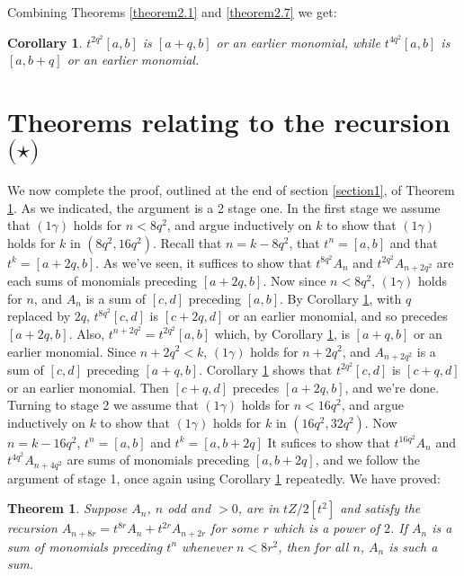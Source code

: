 \documentclass{monsky2009}
\newtheorem{theorem}[definition]{Theorem}
\newtheorem{corollary}[definition]{Corollary}
\begin{document}
Combining Theorems \ref{theorem2.1} and \ref{theorem2.7} we get:

\begin{corollary}%
\label{corollary2.8}
$t^{2q^{2}}[a,b]$ is $[a+q,b]$ or an earlier monomial, while $t^{4q^{2}}[a,b]$ is $[a,b+q]$ or an earlier monomial.
\end{corollary}

\section{Theorems relating to the recursion $\bm (\star)$}
\label{section3}

We now complete the proof, outlined at the end of section \ref{section1}, of Theorem \ref{theorem3.1}. As we indicated, the argument is a 2 stage one. In the first stage we assume that $(1\gamma)$ holds for $n<8q^{2}$, and argue inductively on $k$ to show that $(1\gamma)$ holds for $k$ in $(8q^{2}, 16q^{2})$. Recall that $n=k-8q^{2}$, that $t^{n}=[a,b]$ and that $t^{k}=[a+2q, b]$. As we've seen, it suffices to show that $t^{8q^{2}}A_{n}$ and $t^{2q^{2}}A_{n+2q^{2}}$ are each sums of monomials preceding $[a+2q,b]$. Now since $n<8q^{2}$, $(1\gamma)$ holds for $n$, and $A_{n}$ is a sum of $[c,d]$ preceding $[a,b]$. By Corollary \ref{corollary2.8}, with $q$ replaced by $2q$, $t^{8q^{2}}[c,d]$ is $[c+2q,d]$ or an earlier monomial, and so precedes $[a+2q,b]$. Also, $t^{n+2q^{2}}=t^{2q^{2}}[a,b]$ which, by Corollary \ref{corollary2.8}, is $[a+q,b]$ or an earlier monomial.  Since $n+2q^{2}<k$, $(1\gamma)$ holds for $n+2q^{2}$, and $A_{n+2q^{2}}$ is a sum of $[c,d]$ preceding $[a+q,b]$. Corollary \ref{corollary2.8} shows that $t^{2q^{2}}[c,d]$ is $[c+q,d]$ or an earlier monomial.  Then $[c+q,d]$ precedes $[a+2q,b]$, and we're done. Turning to stage 2 we assume that $(1\gamma)$ holds for $n<16q^{2}$, and argue inductively on $k$ to show that $(1\gamma)$ holds for $k$ in $(16q^{2},32q^{2})$. Now $n=k-16q^{2}$, $t^{n}=[a,b]$ and $t^{k}=[a,b+2q]$ It sufices to show that $t^{16q^{2}}A_{n}$ and $t^{4q^{2}}A_{n+4q^{2}}$ are sums of monomials preceding $[a,b+2q]$, and we follow the argument of stage 1, once again using Corollary \ref{corollary2.8} repeatedly.  We have proved:

\begin{theorem}
\label{theorem3.1}
Suppose $A_{n}$, $n$ odd and $>0$, are in $tZ/2[t^{2}]$ and satisfy the recursion $A_{n+8r}=t^{8r}A_{n}+t^{2r}A_{n+2r}$ for some $r$ which is a power of $2$. If $A_{n}$ is a sum of monomials preceding $t^{n}$ whenever $n<8r^{2}$, then for all $n$, $A_{n}$ is such a sum.
\end{theorem}
\end{document}
